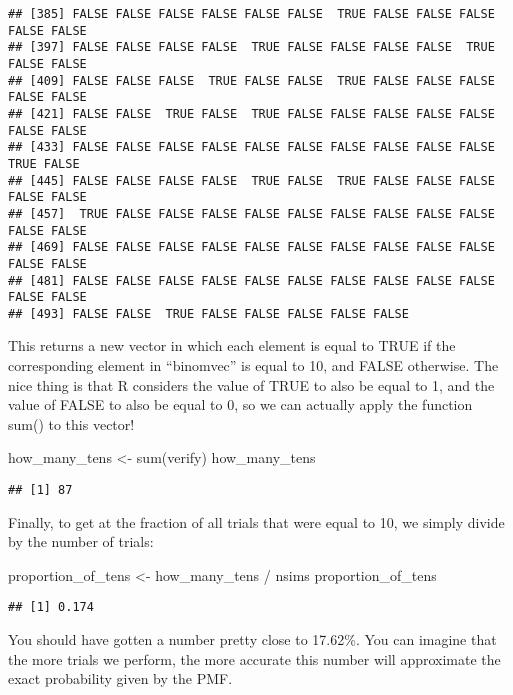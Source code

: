\documentclass[
]{book}
\newenvironment{Shaded}{\begin{snugshade}}{\end{snugshade}}
\newcommand{\FunctionTok}[1]{\textcolor[rgb]{0.00,0.00,0.00}{#1}}
\newcommand{\NormalTok}[1]{#1}
\newcommand{\OtherTok}[1]{\textcolor[rgb]{0.56,0.35,0.01}{#1}}
\newcommand{\SpecialCharTok}[1]{\textcolor[rgb]{0.00,0.00,0.00}{#1}}
\begin{document}
\begin{verbatim}
## [385] FALSE FALSE FALSE FALSE FALSE FALSE  TRUE FALSE FALSE FALSE FALSE FALSE
## [397] FALSE FALSE FALSE FALSE  TRUE FALSE FALSE FALSE FALSE  TRUE FALSE FALSE
## [409] FALSE FALSE FALSE  TRUE FALSE FALSE  TRUE FALSE FALSE FALSE FALSE FALSE
## [421] FALSE FALSE  TRUE FALSE  TRUE FALSE FALSE FALSE FALSE FALSE FALSE FALSE
## [433] FALSE FALSE FALSE FALSE FALSE FALSE FALSE FALSE FALSE FALSE  TRUE FALSE
## [445] FALSE FALSE FALSE FALSE  TRUE FALSE  TRUE FALSE FALSE FALSE FALSE FALSE
## [457]  TRUE FALSE FALSE FALSE FALSE FALSE FALSE FALSE FALSE FALSE FALSE FALSE
## [469] FALSE FALSE FALSE FALSE FALSE FALSE FALSE FALSE FALSE FALSE FALSE FALSE
## [481] FALSE FALSE FALSE FALSE FALSE FALSE FALSE FALSE FALSE FALSE FALSE FALSE
## [493] FALSE FALSE  TRUE FALSE FALSE FALSE FALSE FALSE
\end{verbatim}

This returns a new vector in which each element is equal to TRUE if the corresponding element in ``binomvec'' is equal to 10, and FALSE otherwise. The nice thing is that R considers the value of TRUE to also be equal to 1, and the value of FALSE to also be equal to 0, so we can actually apply the function sum() to this vector!

\begin{Shaded}
\begin{Highlighting}[]
\NormalTok{how\_many\_tens }\OtherTok{\textless{}{-}} \FunctionTok{sum}\NormalTok{(verify)}
\NormalTok{how\_many\_tens}
\end{Highlighting}
\end{Shaded}

\begin{verbatim}
## [1] 87
\end{verbatim}

Finally, to get at the fraction of all trials that were equal to 10, we simply divide by the number of trials:

\begin{Shaded}
\begin{Highlighting}[]
\NormalTok{proportion\_of\_tens }\OtherTok{\textless{}{-}}\NormalTok{ how\_many\_tens }\SpecialCharTok{/}\NormalTok{ nsims}
\NormalTok{proportion\_of\_tens}
\end{Highlighting}
\end{Shaded}

\begin{verbatim}
## [1] 0.174
\end{verbatim}

You should have gotten a number pretty close to 17.62\%. You can imagine that the more trials we perform, the more accurate this number will approximate the exact probability given by the PMF.
\end{document}
